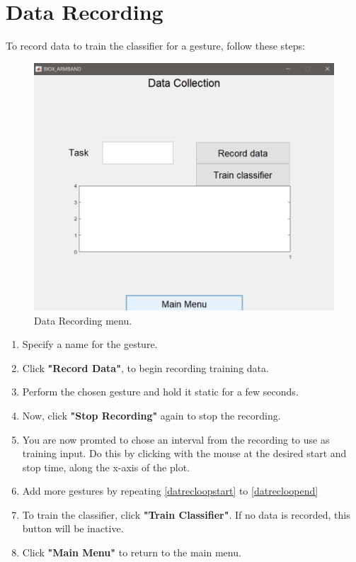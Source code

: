 \chapter{Data Recording}
To record data to train the classifier for a gesture, follow these steps:\\

\begin{figure}[H]
    \centering
    \includegraphics[width=0.6\linewidth]{figures/AppPics/4_DataRecording1.PNG}
    \caption{Data Recording menu.}
    \label{fig:my_label}
\end{figure}

\begin{enumerate}[label=\textbf{Step \arabic*}:]
    \item \label{datrecloopstart} Specify a name for the gesture.
    \item Click \textbf{"Record Data"}, to begin recording training data.
    \item Perform the chosen gesture and hold it static for a few seconds.
    \item Now, click \textbf{"Stop Recording"} again to stop the recording. 
    \item \label{datrecloopend} You are now promted to chose an interval from the recording to use as training input. Do this by clicking with the mouse at the desired start and stop time, along the x-axis of the plot.
    \item Add more gestures by repeating \ref{datrecloopstart} to \ref{datrecloopend}
    \item To train the classifier, click \textbf{"Train Classifier"}. If no data is recorded, this button will be inactive.
    \item Click \textbf{"Main Menu"} to return to the main menu.
    
    
\end{enumerate}